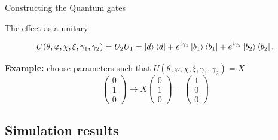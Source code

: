 \documentclass[t]{beamer}
\begin{document}
\begin{frame}{Constructing the Quantum gates}

\begin{block}{The effect as a unitary}

\begin{equation}
U(\theta,\varphi,\chi,\xi,\gamma_1,\gamma_2) = U_2U_1 = \ket{d}\bra{d} + e^{i\gamma_1}\ket{b_1}\bra{b_1} + e^{i\gamma_2}\ket{b_2}\bra{b_2}.
\end{equation}

\end{block}

\begin{block}


\textbf{Example:} choose parameters such that $U(\theta,\varphi,\chi,\xi,\gamma_1,\gamma_2) = X$
\begin{equation}
\begin{pmatrix}
0\\
1\\
0
\end{pmatrix}
\rightarrow X\begin{pmatrix}
0\\
1\\
0
\end{pmatrix}
= 
\begin{pmatrix}
1\\
0\\
0
\end{pmatrix}
\end{equation}
\end{block}
\end{frame}


\subsection{Simulation results}
\begin{frame}{}
\tableofcontents[ 
currentsubsection, 
hideothersubsections, 
sectionstyle=show/shaded, 
subsectionstyle=show/shaded, 
] 


\end{frame}
\end{document}
